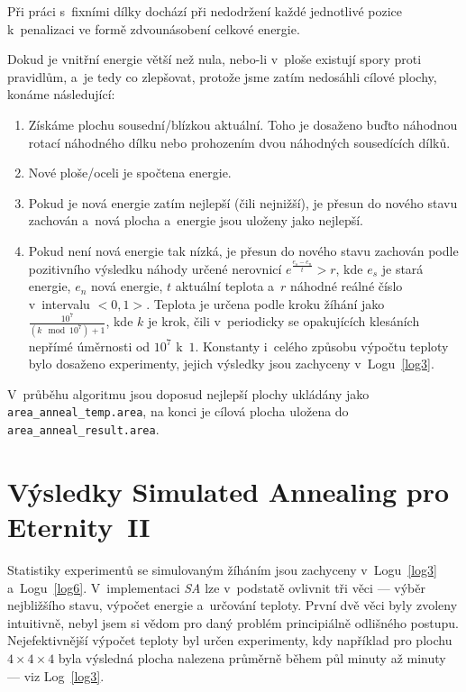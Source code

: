 \documentclass[11pt, titlepage]{report}
\begin{document}
Při práci s~fixními dílky dochází při nedodržení každé jednotlivé pozice k~penalizaci ve formě zdvounásobení celkové energie.

Dokud je vnitřní energie větší než nula, nebo-li v~ploše existují spory proti pravidlům, a~je tedy co zlepšovat, protože jsme zatím nedosáhli cílové plochy, konáme následující:

\begin{enumerate}
\item Získáme plochu sousední/blízkou aktuální. Toho je dosaženo buďto náhodnou rotací náhodného dílku nebo prohozením dvou náhodných sousedících dílků.
\item Nové ploše/oceli je spočtena energie.
\item Pokud je nová energie zatím nejlepší (čili nejnižší), je přesun do nového stavu zachován a~nová plocha a~energie jsou uloženy jako nejlepší.
\item Pokud není nová energie tak nízká, je přesun do nového stavu zachován podle pozitivního výsledku náhody určené nerovnicí $e^{\frac{e_{s} - e_{n}}{t}} > r$, kde $e_{s}$ je stará energie, $e_{n}$ nová energie, $t$ aktuální teplota a~$r$ náhodné reálné číslo v~intervalu $<0,1>$. Teplota je určena podle kroku žíhání jako $\frac{10^{7}}{(k \mod{10^{7}}) + 1}$, kde $k$ je krok, čili v~periodicky se opakujících klesáních nepřímé úměrnosti od $10^{7}$ k~$1$. Konstanty i~celého způsobu výpočtu teploty bylo dosaženo experimenty, jejich výsledky jsou zachyceny v~Logu~\ref{log3}.
\end{enumerate}

V~průběhu algoritmu jsou doposud nejlepší plochy ukládány jako \texttt{area\_anneal\_temp.area}, na konci je cílová plocha uložena do \texttt{area\_anneal\_result.area}.

\section{Výsledky Simulated Annealing pro Eternity~II}
\label{sec:sa-vysl}

Statistiky experimentů se simulovaným žíháním jsou zachyceny v~Logu~\ref{log3} a~Logu~\ref{log6}. V~implementaci \emph{SA} lze v~podstatě ovlivnit tři věci --- výběr nejbližšího stavu, výpočet energie a~určování teploty. První dvě věci byly zvoleny intuitivně, nebyl jsem si vědom pro daný problém principiálně odlišného postupu. Nejefektivnější výpočet teploty byl určen experimenty, kdy například pro plochu $4 \times 4 \times 4$ byla výsledná plocha nalezena průměrně během půl minuty až minuty --- viz Log~\ref{log3}.
\end{document}
